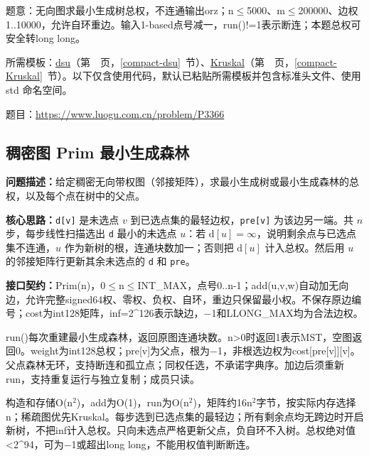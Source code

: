 \label{usage-example-314}

题意：无向图求最小生成树总权，不连通输出orz；n$\le$5000、m$\le$200000、边权1..10000，允许自环重边。输入1-based点号减一，run()!=1表示断连；本题总权可安全转long long。

所需模板：\hyperref[compact-dsu]{dsu}（第~\pageref{compact-dsu}~页，\ref{compact-dsu}~节）、\hyperref[compact-Kruskal]{Kruskal}（第~\pageref{compact-Kruskal}~页，\ref{compact-Kruskal}~节）。以下仅含使用代码，默认已粘贴所需模板并包含标准头文件、使用 std 命名空间。

题目：\url{https://www.luogu.com.cn/problem/P3366}



\Needspace{617pt}

\subsection{稠密图 Prim 最小生成森林}\label{compact-Prim}

\noindent\textbf{问题描述：}\allowbreak 给定稠密无向带权图（邻接矩阵），求最小生成树或最小生成森林的总权，以及每个点在树中的父点。

\textbf{核心思路：}\allowbreak \texttt{d[v]} 是未选点 $v$ 到已选点集的最轻边权，\texttt{pre[v]} 为该边另一端。共 $n$ 步，每步线性扫描选出 \texttt{d} 最小的未选点 $u$：若 $\mathrm{d}[u]=\infty$，说明剩余点与已选点集不连通，$u$ 作为新树的根，连通块数加一；否则把 $\mathrm{d}[u]$ 计入总权。然后用 $u$ 的邻接矩阵行更新其余未选点的 \texttt{d} 和 \texttt{pre}。



{\sloppy{}\noindent\textbf{接口契约：}Prim(n)，0$\le$n$\le$INT\_MAX，点号0..n-1；add(u,v,w)自动加无向边，允许完整signed64权、零权、负权、自环，重边只保留最小权。不保存原边编号；cost为int128矩阵，inf=2\textasciicircum{}126表示缺边，−1和LLONG\_MAX均为合法边权。

run()每次重建最小生成森林，返回原图连通块数。n>0时返回1表示MST，空图返回0。weight为int128总权；pre[v]为父点，根为−1，非根选边权为cost[pre[v]][v]。父点森林无环，支持断连和孤立点；同权任选，不承诺字典序。加边后须重新run，支持重复运行与独立复制；成员只读。

构造和存储O(n$^{2}$)，add为O(1)，run为O(n$^{2}$)，矩阵约16n$^{2}$字节，按实际内存选择n；稀疏图优先Kruskal。每步选到已选点集的最轻边；所有剩余点均无跨边时开启新树，不把inf计入总权。只向未选点严格更新父点，负自环不入树。总权绝对值<2\textasciicircum{}94，可为−1或超出long long，不能用权值判断断连。\par}

